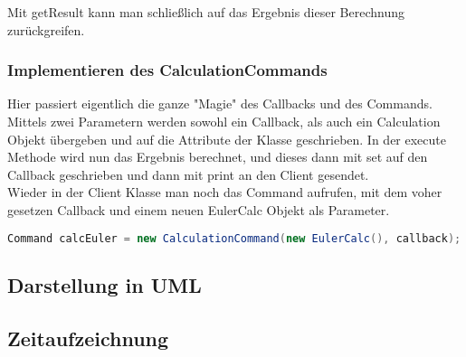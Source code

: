 Mit getResult kann man schlie{\ss}lich auf das Ergebnis dieser Berechnung zurückgreifen.

\subsubsection{Implementieren des CalculationCommands}

Hier passiert eigentlich die ganze "Magie" des Callbacks und des Commands. Mittels zwei Parametern werden sowohl ein Callback, als auch ein Calculation Objekt übergeben und auf die Attribute der Klasse geschrieben. In der execute Methode wird nun das Ergebnis berechnet, und dieses dann mit set auf den Callback geschrieben und dann mit print an den Client gesendet. \\ 

Wieder in der Client Klasse man noch das Command aufrufen, mit dem voher gesetzen Callback und einem neuen EulerCalc Objekt als Parameter.

\begin{lstlisting}[caption=Aufrufen des Commandos, language=Java]
				Command calcEuler = new CalculationCommand(new EulerCalc(), callback);

\end{lstlisting}

\subsection{Darstellung in UML}

\subsection{Zeitaufzeichnung}





